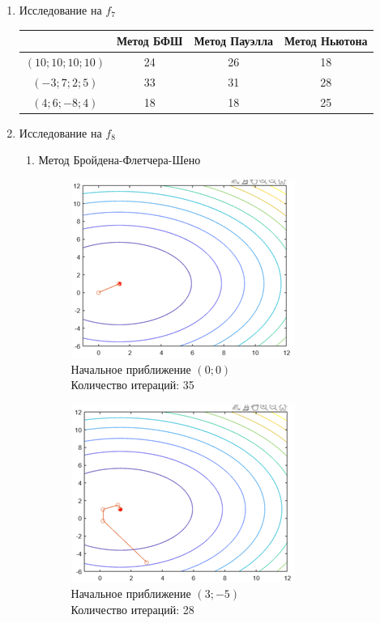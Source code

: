 \documentclass[12pt]{article}
\begin{document}
\begin{enumerate}
\begin{enumerate}
	\end{enumerate}

	\item Исследование на $f_7$

	\begin{table}[H]
	\centering
\begin{tabular}{|c|c|c|c|}
\hline
\rowcolor[HTML]{FFF0DB}
{\color[HTML]{333333} \textbf{}} & \textbf{Метод БФШ} & \textbf{Метод Пауэлла} & \textbf{Метод Ньютона} \\ \hline
$\left( 10; 10; 10; 10 \right)$ & 24 & 26 & 18 \\ \hline
$\left( -3; 7; 2; 5 \right)$    & 33 & 31 & 28 \\ \hline
$\left( 4; 6; -8; 4 \right)$    & 18 & 18 & 25 \\ \hline
\end{tabular}
\end{table}

	\item Исследование на $f_8$
	\begin{enumerate}

	\item Метод Бройдена-Флетчера-Шено
	\begin{figure}[H]
	\begin{minipage}{.5\textwidth}
    	\centering
    	\includegraphics[]{img/f8_1_1.png}
    	\\ Начальное приближение $\left( 0; 0 \right)$
    	\\ Количество итераций: 35
	\end{minipage}
	\begin{minipage}{.5\textwidth}
    	\centering
    	\includegraphics[]{img/f8_1_2.png}
    	\\ Начальное приближение $\left( 3; -5 \right)$
    	\\ Количество итераций: 28
	\end{minipage}
    \end{figure}


\end{enumerate}
\end{enumerate}
\end{document}
